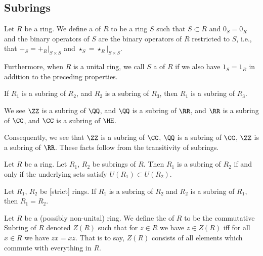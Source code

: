 \subsection{Subrings}

\begin{definition}[Subrings]
Let $R$ be a ring. We define a  of $R$ to be a ring
$S$ such that $S\subset R$ and $0_{S}=0_{R}$ and the binary operators
of $S$ are the binary operators of $R$ restricted to $S$, i.e., that
$+_{S} = +_{R}|_{S\times S}$ and  $\star_{S} = \star_{R}|_{S\times S}$.

Furthermore, when $R$ is a unital ring, we call $S$ a  
of $R$ if we also have $1_{S}=1_{R}$ in addition to the preceding
properties. 
\end{definition}

\begin{theorem}
If $R_{1}$ is a subring of $R_{2}$, and $R_{2}$ is a subring of
$R_{3}$, then $R_{1}$ is a subring of $R_{3}$.
\end{theorem}

\begin{example}
We see $\ZZ$ is a subring of $\QQ$, and $\QQ$ is a subring of $\RR$,
and $\RR$ is a subring of $\CC$,
and $\CC$ is a subring of $\HH$.

Consequently, we see that $\ZZ$ is a subring of $\CC$, $\QQ$ is a
subring of $\CC$, $\ZZ$ is a subring of $\RR$. These facts follow from
the transitivity of subrings.
\end{example}

\begin{theorem}
Let $R$ be a ring. Let $R_{1}$, $R_{2}$ be subrings of $R$.
Then $R_{1}$ is a subring of $R_{2}$ if and only if the underlying
sets satisfy $U(R_{1})\subset U(R_{2})$.
\end{theorem}

\begin{theorem}
Let $R_{1}$, $R_{2}$ be [strict] rings.
If $R_{1}$ is a subring of $R_{2}$ and $R_{2}$ is a subring of
$R_{1}$, then $R_{1}=R_{2}$.
\end{theorem}

\begin{definition}
Let $R$ be a (possibly non-unital) ring. We define the  of $R$
to be the commutative Subring of $R$ denoted $Z(R)$ such that
for $z\in R$ we have $z\in Z(R)$ iff for all $x\in R$ we have $zx=xz$.
That is to say, $Z(R)$ consists of all elements which commute with
everything in $R$.
\end{definition}

